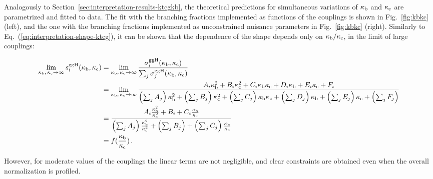 Analogously to Section~\ref{sec:interpretation-results-ktcgkb}, the theoretical predictions for simultaneous variations of $\kappa_{\mathrm{b}}$ and $\kappa_{\mathrm{c}}$ are parametrized and fitted to data.
% 
The fit with the branching fractions implemented as functions of the couplings is shown in Fig.~\ref{fig:kbkc} (left), and the one with the branching fractions implemented as unconstrained nuisance parameters in Fig.~\ref{fig:kbkc} (right).
% 
Similarly to Eq.~(\ref{eq:interpretation-shape-ktcg}), it can be shown that the dependence of the shape depends only on $\kappa_{\mathrm{b}}/\kappa_{\mathrm{c}}$, in the limit of large couplings:
% 
\begin{linenomath*}
\begin{equation}
\label{eq:interpretation-shape-kbkc}
\begin{split}
\lim_{\kappa_{\mathrm{b}},\,\kappa_{\mathrm{c}}\to\infty} s^{\mathrm{g}\mathrm{g}\mathrm{H}}_i(\kappa_{\mathrm{b}}, \kappa_{\mathrm{c}})
        &=
        \lim_{\kappa_{\mathrm{b}},\,\kappa_{\mathrm{c}}\to\infty}
        \frac
            {\sigma^{\mathrm{g}\mathrm{g}\mathrm{H}}_i(\kappa_{\mathrm{b}}, \kappa_{\mathrm{c}})}
            {\sum_j \sigma^{\mathrm{g}\mathrm{g}\mathrm{H}}_j(\kappa_{\mathrm{b}}, \kappa_{\mathrm{c}})}
            \\
        &=
        \lim_{\kappa_{\mathrm{b}},\,\kappa_{\mathrm{c}}\to\infty}
        \frac
            {A_i \kappa_{\mathrm{b}}^2 + B_i \kappa_{\mathrm{c}}^2 + C_i \kappa_{\mathrm{b}} \kappa_{\mathrm{c}}
                + D_i \kappa_{\mathrm{b}} + E_i \kappa_{\mathrm{c}} + F_i
                }
            {
                \left(\sum_j A_j\right) \kappa_{\mathrm{b}}^2
                + \left(\sum_j B_j\right) \kappa_{\mathrm{c}}^2
                + \left(\sum_j C_j\right) \kappa_{\mathrm{b}}\kappa_{\mathrm{c}}
                + \left(\sum_j D_j\right) \kappa_{\mathrm{b}}
                + \left(\sum_j E_j\right) \kappa_{\mathrm{c}}
                + \left(\sum_j F_j\right)
                }
            \\
        &=
        \frac
            {A_i \frac{\kappa_{\mathrm{b}}^2}{\kappa_{\mathrm{c}}^2} + B_i + C_i \frac{\kappa_{\mathrm{b}}}{\kappa_{\mathrm{c}}}}
            {
                \left(\sum_j A_j\right) \frac{\kappa_{\mathrm{b}}^2}{\kappa_{\mathrm{c}}^2}
                + \left(\sum_j B_j\right) 
                + \left(\sum_j C_j\right) \frac{\kappa_{\mathrm{b}}}{\kappa_{\mathrm{c}}}
                }
            \\
        & = f(\frac{\kappa_{\mathrm{b}}}{\kappa_{\mathrm{c}}})
\,.
\end{split}
\end{equation}
\end{linenomath*}
% 
However, for moderate values of the couplings the linear terms are not negligible, and clear constraints are obtained even when the overall normalization is profiled.


